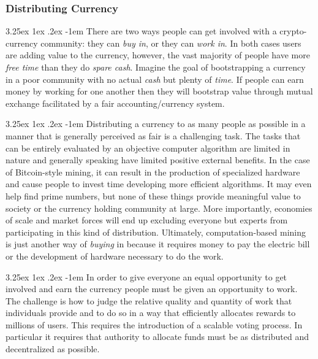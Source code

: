 \documentclass{article}
\makeatletter
\renewcommand\paragraph{\@startsection{paragraph}{5}{\z@}%
  {3.25ex \@plus1ex \@minus.2ex}%
  {-1em}%
  {\normalfont\normalsize\bfseries}}
\makeatother
\begin{document}
			\subsubsection{Distributing Currency}

				\paragraph{}
					There are two ways people can get involved with a crypto-currency community: they can \textit{buy in}, or they can \textit{work in}. In both cases users are adding value to the currency, however, the vast majority of people have more \textit{free time} than they do \textit{spare cash}. Imagine the goal of bootstrapping a currency in a poor community with no actual \textit{cash} but plenty of \textit{time}. If people can earn money by working for one another then they will bootstrap value through mutual exchange facilitated by a fair accounting/currency system.

				\paragraph{}
					Distributing a currency to as many people as possible in a manner that is generally perceived as fair is a challenging task. The tasks that can be entirely evaluated by an objective computer algorithm are limited in nature and generally speaking have limited positive external benefits. In the case of Bitcoin-style mining, it can result in the production of specialized hardware and cause people to invest time developing more efficient algorithms. It may even help find prime numbers, but none of these things provide meaningful value to society or the currency holding community at large. More importantly, economies of scale and market forces will end up excluding everyone but experts from participating in this kind of distribution. Ultimately, computation-based mining is just another way of \textit{buying} in because it requires money to pay the electric bill or the development of hardware necessary to do the work.

				\paragraph{}
					In order to give everyone an equal opportunity to get involved and earn the currency people must be given an opportunity to work. The challenge is how to judge the relative quality and quantity of work that individuals provide and to do so in a way that efficiently allocates rewards to millions of users. This requires the introduction of a scalable voting process. In particular it requires that authority to allocate funds must be as distributed and decentralized as possible.
\end{document}
